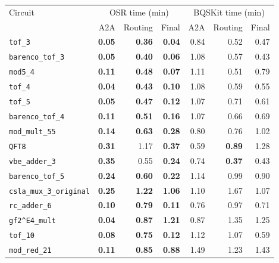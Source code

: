 
\begin{table}[p]
\centering
\scriptsize
\begin{tabular}{l|rrr|rrr}
\hline
Circuit & \multicolumn{3}{c|}{OSR time (min)} & \multicolumn{3}{c}{BQSKit time (min)} \\
 & A2A & Routing & Final & A2A & Routing & Final \\
\hline
\texttt{tof\_3} & \textbf{0.05} & \textbf{0.36} & \textbf{0.04} & 0.84 & 0.52 & 0.47 \\
\texttt{barenco\_tof\_3} & \textbf{0.05} & \textbf{0.40} & \textbf{0.06} & 1.08 & 0.57 & 0.43 \\
\texttt{mod5\_4} & \textbf{0.11} & \textbf{0.48} & \textbf{0.07} & 1.11 & 0.51 & 0.79 \\
\texttt{tof\_4} & \textbf{0.04} & \textbf{0.43} & \textbf{0.10} & 1.08 & 0.59 & 0.55 \\
\texttt{tof\_5} & \textbf{0.05} & \textbf{0.47} & \textbf{0.12} & 1.07 & 0.71 & 0.61 \\
\texttt{barenco\_tof\_4} & \textbf{0.11} & \textbf{0.51} & \textbf{0.16} & 1.07 & 0.66 & 0.69 \\
\texttt{mod\_mult\_55} & \textbf{0.14} & \textbf{0.63} & \textbf{0.28} & 0.80 & 0.76 & 1.02 \\
\texttt{QFT8} & \textbf{0.31} & 1.17 & \textbf{0.37} & 0.59 & \textbf{0.89} & 1.28 \\
\texttt{vbe\_adder\_3} & \textbf{0.35} & 0.55 & \textbf{0.24} & 0.74 & \textbf{0.37} & 0.43 \\
\texttt{barenco\_tof\_5} & \textbf{0.24} & \textbf{0.60} & \textbf{0.22} & 1.14 & 0.99 & 0.90 \\
\texttt{csla\_mux\_3\_original} & \textbf{0.25} & \textbf{1.22} & \textbf{1.06} & 1.10 & 1.67 & 1.07 \\
\texttt{rc\_adder\_6} & \textbf{0.10} & \textbf{0.79} & \textbf{0.11} & 0.76 & 0.97 & 0.71 \\
\texttt{gf2\textasciicircum{}E4\_mult} & \textbf{0.04} & \textbf{0.87} & \textbf{1.21} & 0.87 & 1.35 & 1.25 \\
\texttt{tof\_10} & \textbf{0.08} & \textbf{0.75} & \textbf{0.12} & 1.12 & 1.07 & 0.59 \\
\texttt{mod\_red\_21} & \textbf{0.11} & \textbf{0.85} & \textbf{0.88} & 1.49 & 1.23 & 1.43 \\

\end{tabular}
\end{table}
